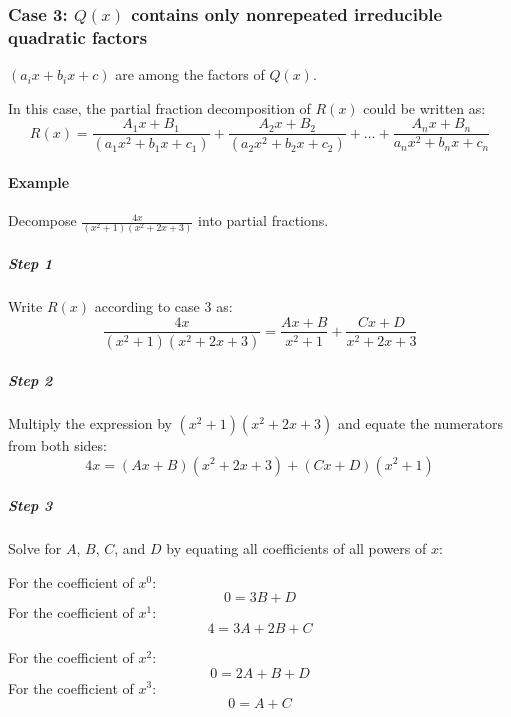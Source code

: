 			\subsubsection{Case 3: $Q(x)$ contains only nonrepeated irreducible quadratic factors}
				$(a_ix+b_ix+c)$ are among the factors of $Q(x)$.

				In this case, the partial fraction decomposition of $R(x)$ could be written as:
				\[R(x) = \frac{A_1x+B_1}{(a_1x^2+b_1x+c_1)} + \frac{A_2x+B_2}{(a_2x^2+b_2x+c_2)} + \dots + \frac{A_nx+B_n}{a_nx^2+b_nx+c_n}\]
				\paragraph{Example}
					Decompose $\frac{4x}{(x^2+1)(x^2+2x+3)}$ into partial fractions.
					\subparagraph{Step 1}
						Write $R(x)$ according to case 3 as:
						\[\frac{4x}{(x^2+1)(x^2+2x+3)} = \frac{Ax+B}{x^2+1} + \frac{Cx+D}{x^2+2x+3}\]
					\subparagraph{Step 2}
						Multiply the expression by $(x^2+1)(x^2+2x+3)$ and equate the numerators from both sides:
						\[4x = (Ax+B)(x^2+2x+3) + (Cx+D)(x^2+1)\]
					\subparagraph{Step 3}
						Solve for $A$, $B$, $C$, and $D$ by equating all coefficients of all powers of $x$:

						\begin{minipage}[t]{0.5\textwidth}
							\centering
							For the coefficient of $x^0$:
							\[0 = 3B + D\]
							For the coefficient of $x^1$:
							\[4 = 3A + 2B + C\]
						\end{minipage}
						\begin{minipage}[t]{0.5\textwidth}
							\centering
							For the coefficient of $x^2$:
							\[0 = 2A + B + D\]
							For the coefficient of $x^3$:
							\[0 = A + C\]
						\end{minipage}

